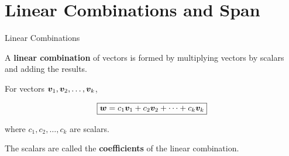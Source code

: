 

\section{Linear Combinations and Span}

\begin{frame}{Linear Combinations}

A \textbf{linear combination} of vectors is formed by multiplying
vectors by scalars and adding the results.

For vectors $\bm{v}_1,\bm{v}_2,\ldots,\bm{v}_k$,

\[
\boxed{
\bm{w}
=
c_1\bm{v}_1
+
c_2\bm{v}_2
+\cdots+
c_k\bm{v}_k
}
\]

where $c_1,c_2,\ldots,c_k$ are scalars.

\vspace{0.4cm}

The scalars are called the \textbf{coefficients} of the linear combination.

\end{frame}



